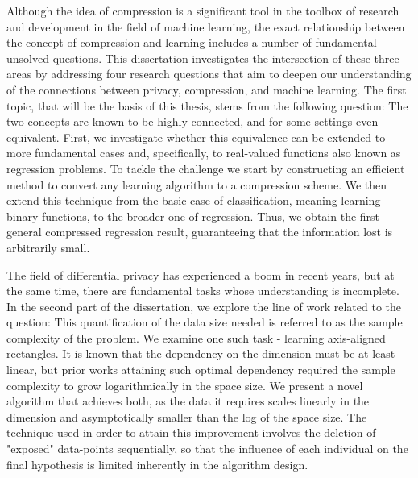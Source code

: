Although the idea of compression is a significant tool in the toolbox of research and development in the field of machine learning, the exact relationship between the concept of compression and learning includes a number of fundamental unsolved questions. This dissertation investigates the intersection of these three areas by addressing four research questions that aim to deepen our understanding of the connections between privacy, compression, and machine learning.
The first topic, that will be the basis of this thesis, stems from the following question: 
The two concepts are known to be highly connected, and for some settings even equivalent. First, we investigate whether this equivalence can be extended to more fundamental cases and, specifically, to real-valued functions also known as regression problems. 
To tackle the challenge we start by constructing an efficient method to convert any learning algorithm to a compression scheme. We then extend this technique from the basic case of classification, meaning learning binary functions, to the broader one of regression. Thus, we obtain the first general compressed regression result, guaranteeing that the information lost is arbitrarily small.


The field of differential privacy has experienced a boom in recent years, but at the same time, there are fundamental tasks whose understanding is incomplete. In the second part of the dissertation, we explore the line of work related to the question:
This quantification of the data size needed is referred to as the sample complexity of the problem. We examine one such task - learning axis-aligned rectangles. It is known that the dependency on the dimension must be at least linear, but prior works attaining such optimal dependency required the sample complexity to grow logarithmically in the space size. We present a novel algorithm that achieves both, as the data it requires scales linearly in the dimension and asymptotically smaller than the log of the space size. The technique used in order to attain this improvement involves the deletion of "exposed" data-points sequentially, so that the influence of each individual on the final hypothesis is limited inherently in the algorithm design.


